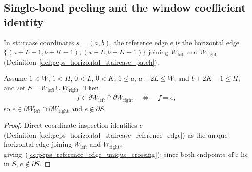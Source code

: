\subsection{Single-bond peeling and the window coefficient identity}
\label{subsec:peps_torus_single_bond_peeling_window_witness}

\begin{definition}
    \label{def:peps_horizontal_staircase_reference_edge}
    \leanok
    In staircase coordinates $s=(a,b)$, the reference edge $e$ is the horizontal
    edge $\{(a+L-1,b+K-1),(a+L,b+K-1)\}$ joining $W_{\mathrm{left}}$ and
    $W_{\mathrm{right}}$ (Definition~\ref{def:peps_horizontal_staircase_patch}).
\end{definition}

\begin{lemma}
    \label{thm:peps_horizontal_staircase_reference_edge_crossing}
    \leanok
    Assume $1<W$, $1<H$, $0<L$, $0<K$, $1\le a$, $a+2L\le W$, and
    $b+2K-1\le H$, and set $S=W_{\mathrm{left}}\cup W_{\mathrm{right}}$. Then
    \begin{align}
        f\in\partial W_{\mathrm{left}}\cap\partial W_{\mathrm{right}}
        \quad\Longleftrightarrow\quad
        f=e,
        \label{eq:peps_reference_edge_unique_crossing}
    \end{align}
    so $e\in\partial W_{\mathrm{left}}\cap\partial W_{\mathrm{right}}$ and
    $e\notin\partial S$.
\end{lemma}
\begin{proof}\leanok
    Direct coordinate inspection identifies $e$ (Definition~\ref{def:peps_horizontal_staircase_reference_edge})
    as the unique horizontal edge joining $W_{\mathrm{left}}$ and
    $W_{\mathrm{right}}$, giving~(\ref{eq:peps_reference_edge_unique_crossing});
    since both endpoints of $e$ lie in $S$, $e\notin\partial S$.
\end{proof}

